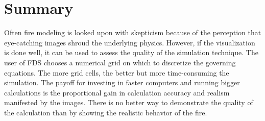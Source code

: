 \documentclass[11pt,twoside]{book}
\begin{document}












%


\chapter{Summary}
Often fire modeling is looked upon with skepticism because of the
perception that eye-catching images shroud the underlying physics.
However, if the visualization is done well, it can be used to
assess the quality of the simulation technique. The user of FDS
chooses a numerical grid on which to discretize the governing
equations. The more grid cells, the better but more time-consuming
the simulation. The payoff for investing in faster computers and
running bigger calculations is the proportional gain in calculation accuracy and realism
manifested by the images. There is no better way to demonstrate
the quality of the calculation than by showing the realistic
behavior of the fire.
\end{document}
